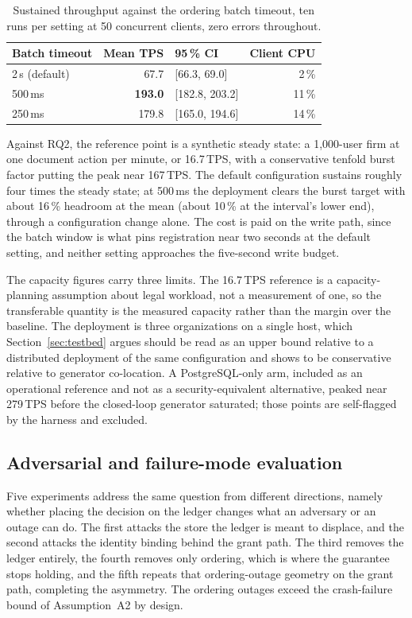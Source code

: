 \documentclass[preprint,12pt]{elsarticle}
\begin{document}
\begin{table}[!t]
\centering
\caption{Sustained throughput against the ordering batch timeout, ten runs per
setting at 50 concurrent clients, zero errors throughout.}
\label{tab:batchtimeout}
\footnotesize
\setlength{\tabcolsep}{6pt}
\begin{tabular}{@{}lrlr@{}}
\toprule
Batch timeout & Mean TPS & 95\,\% CI & Client CPU \\
\midrule
2\,s (default) & 67.7  & [66.3, 69.0]   & 2\,\% \\
500\,ms        & \textbf{193.0} & [182.8, 203.2] & 11\,\% \\
250\,ms        & 179.8 & [165.0, 194.6] & 14\,\% \\
\bottomrule
\end{tabular}
\end{table}

Against RQ2, the reference point is a synthetic steady state: a 1{,}000-user
firm at one document action per minute, or 16.7\,TPS, with a conservative
tenfold burst factor putting the peak near 167\,TPS. The default configuration
sustains roughly four times the steady state; at 500\,ms the deployment clears
the burst target with about 16\,\% headroom at the mean (about 10\,\% at the
interval's lower end), through a configuration change alone. The cost is paid
on the write path, since
the batch window is what pins registration near two seconds at the default
setting, and neither setting approaches the five-second write budget.

The capacity figures carry three limits. The 16.7\,TPS reference is a
capacity-planning assumption about legal workload, not a measurement of one, so
the transferable quantity is the measured capacity rather than the margin over
the baseline. The deployment is three organizations on a single host, which
Section~\ref{sec:testbed} argues should be read as an upper bound relative to
a distributed deployment of the same configuration and shows to be
conservative relative to generator co-location. A PostgreSQL-only arm,
included as an operational reference and not as a security-equivalent
alternative, peaked near 279\,TPS before the closed-loop
generator saturated; those points are self-flagged by the harness and excluded.


\subsection{Adversarial and failure-mode evaluation}

Five experiments address the same question from different directions, namely
whether placing the decision on the ledger changes what an adversary or an
outage can do. The first attacks the store the ledger is meant to
displace, and the second attacks the identity binding behind the grant path.
The third removes the ledger entirely, the fourth removes only ordering,
which is where the guarantee stops holding, and the fifth repeats that
ordering-outage geometry on the grant path, completing the asymmetry. The
ordering outages exceed the crash-failure bound of Assumption~A2 by
design.
\end{document}
